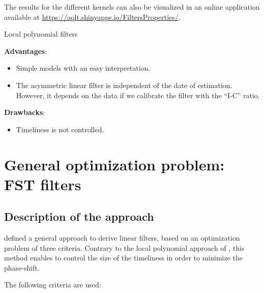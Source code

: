 \documentclass[
  12pt,
  ,
  a4paper]{article}
\providecommand{\tightlist}{%
  \setlength{\itemsep}{0pt}\setlength{\parskip}{0pt}}
\newcommand\1{\mathds{1}}
\begin{document}
The results for the different kernels can also be visualized in an online application available at \url{https://aqlt.shinyapps.io/FiltersProperties/}.

\begin{summary}{Local polynomial filters}

\textbf{Advantages}:

\begin{itemize}
\item
  Simple models with an easy interpretation.
\item
  The asymmetric linear filter is independent of the date of estimation.
  However, it depends on the data if we calibrate the filter with the ``I-C'' ratio.
\end{itemize}

\textbf{Drawbacks}:

\begin{itemize}
\tightlist
\item
  Timeliness is not controlled.
\end{itemize}

\end{summary}

\hypertarget{sec:GuggemosEtAl}{%
\section{General optimization problem: FST filters}\label{sec:GuggemosEtAl}}

\hypertarget{description-of-the-approach}{%
\subsection{Description of the approach}\label{description-of-the-approach}}

\textcite{ch15HBSA} defined a general approach to derive linear filters, based on an optimization problem of three criteria.
Contrary to the local polynomial approach of \textcite{proietti2008}, this method enables to control the size of the timeliness in order to minimize the phase-shift.

The following criteria are used:
\end{document}
